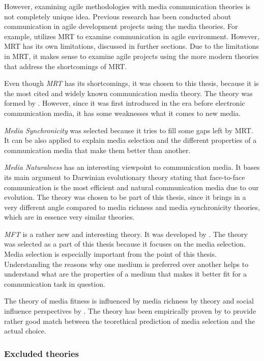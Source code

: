 \documentclass[english,12pt,a4paper,pdftex]{article}
\begin{document}
However, examining agile methodologies with media communication theories is not completely unique idea. Previous research has been conducted about communication in agile development projects using the media theories. For example, \citet{korkala2006} utilizes \ac{MRT} to examine communication in agile environment. However, \ac{MRT} has its own limitations, discussed in further sections. Due to the limitations in \ac{MRT}, it makes sense to examine agile projects using the more modern theories that address the shortcomings of \ac{MRT}.

Even though \emph{\ac{MRT}} has its shortcomings, it was chosen to this thesis, because it is the most cited and widely known communication media theory. The theory was formed by \citet{daft1986}. However, since it was first introduced in the era before electronic communication media, it has some weaknesses what it comes to new media.

\emph{Media Synchronicity} was selected because it tries to fill some gaps left by \ac{MRT}. It can be also applied to explain media selection and the different properties of a communication media that make them better than another.

\emph{Media Naturalness} has an interesting viewpoint to communication media. It bases its main argument to Darwinian evolutionary theory stating that face-to-face communication is the most efficient and natural communication media due to our evolution. The theory was chosen to be part of this thesis, since it brings in a very different angle compared to media richness and media synchronicity theories, which are in essence very similar theories.

\emph{\Acl{MFT}} is a rather new and interesting theory. It was developed by \citet{higa2007}. The theory was selected as a part of this thesis because it focuses on the media selection. Media selection is especially important from the point of this thesis. Understanding the reasons why one medium is preferred over another helps to understand what are the properties of a medium that makes it better fit for a communication task in question.

The theory of media fitness is influenced by media richness by \citet{daft1986} theory and social influence perspectives by \citet{schmitz1991}. The theory has been empirically proven by \citet{gu2011} to provide rather good match between the teorethical prediction of media selection and the actual choice.

\subsubsection{Excluded theories}
\end{document}
